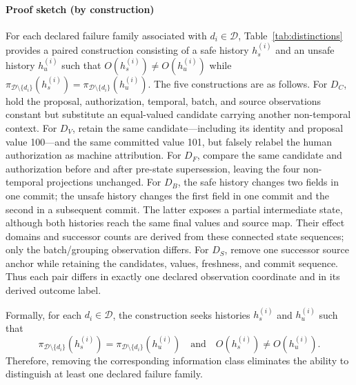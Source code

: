 \paragraph{Proof sketch (by construction)}
For each declared failure family associated with $d_i\in\mathcal D$, Table~\ref{tab:distinctions} provides a paired construction consisting of a safe history $h_s^{(i)}$ and an unsafe history $h_u^{(i)}$ such that
$O(h_s^{(i)})\neq O(h_u^{(i)})$ while
$\pi_{\mathcal D\setminus\{d_i\}}(h_s^{(i)})=\pi_{\mathcal D\setminus\{d_i\}}(h_u^{(i)})$.
The five constructions are as follows. For $D_C$, hold the proposal, authorization, temporal, batch, and source observations constant but substitute an equal-valued candidate carrying another non-temporal context. For $D_V$, retain the same candidate---including its identity and proposal value 100---and the same committed value 101, but falsely relabel the human authorization as machine attribution. For $D_F$, compare the same candidate and authorization before and after pre-state supersession, leaving the four non-temporal projections unchanged. For $D_B$, the safe history changes two fields in one commit; the unsafe history changes the first field in one commit and the second in a subsequent commit. The latter exposes a partial intermediate state, although both histories reach the same final values and source map. Their effect domains and successor counts are derived from these connected state sequences; only the batch/grouping observation differs. For $D_S$, remove one successor source anchor while retaining the candidates, values, freshness, and commit sequence. Thus each pair differs in exactly one declared observation coordinate and in its derived outcome label.

Formally, for each $d_i\in\mathcal D$, the construction seeks histories $h_s^{(i)}$ and $h_u^{(i)}$ such that
\begin{equation}
\pi_{\mathcal D\setminus\{d_i\}}(h_s^{(i)})
=
\pi_{\mathcal D\setminus\{d_i\}}(h_u^{(i)})
\quad\text{and}\quad
O(h_s^{(i)})\neq O(h_u^{(i)}).
\label{eq:irredundancy}
\end{equation}
Therefore, removing the corresponding information class eliminates the ability to distinguish at least one declared failure family.

